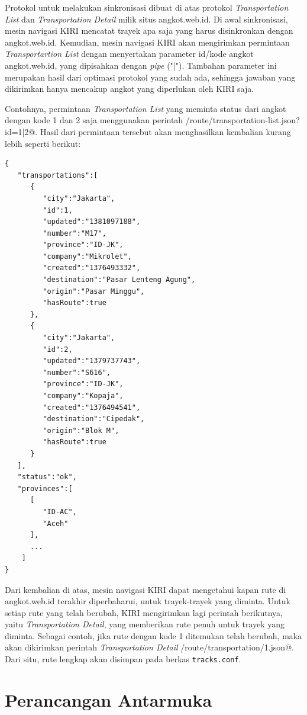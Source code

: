 Protokol untuk melakukan sinkronisasi dibuat di atas protokol \textit{Transportation List} dan \textit{Transportation Detail} milik situs angkot.web.id. Di awal sinkronisasi, mesin navigasi KIRI mencatat trayek apa saja yang harus disinkronkan dengan angkot.web.id. Kemudian, mesin navigasi KIRI akan mengirimkan permintaan \textit{Transportartion List} dengan menyertakan parameter id/kode angkot angkot.web.id, yang dipisahkan dengan \textit{pipe} ("|"). Tambahan parameter ini merupakan hasil dari optimasi protokol yang sudah ada, sehingga jawaban yang dikirimkan hanya mencakup angkot yang diperlukan oleh KIRI saja.

Contohnya, permintaan \textit{Transportation List} yang meminta status dari angkot dengan kode 1 dan 2 saja menggunakan perintah \verb@GET /route/transportation-list.json?id=1|2@. Hasil dari permintaan tersebut akan menghasilkan kembalian kurang lebih seperti berikut:

\begin{lstlisting}
{
   "transportations":[
      {
         "city":"Jakarta",
         "id":1,
         "updated":"1381097188",
         "number":"M17",
         "province":"ID-JK",
         "company":"Mikrolet",
         "created":"1376493332",
         "destination":"Pasar Lenteng Agung",
         "origin":"Pasar Minggu",
         "hasRoute":true
      },
      {
         "city":"Jakarta",
         "id":2,
         "updated":"1379737743",
         "number":"S616",
         "province":"ID-JK",
         "company":"Kopaja",
         "created":"1376494541",
         "destination":"Cipedak",
         "origin":"Blok M",
         "hasRoute":true
      }
   ],
   "status":"ok",
   "provinces":[
      [
         "ID-AC",
         "Aceh"
      ],
      ...
    ]
}
\end{lstlisting}

Dari kembalian di atas, mesin navigasi KIRI dapat mengetahui kapan rute di angkot.web.id terakhir diperbaharui, untuk trayek-trayek yang diminta. Untuk setiap rute yang telah berubah, KIRI mengirimkan lagi perintah berikutnya, yaitu \textit{Transportation Detail}, yang memberikan rute penuh untuk trayek yang diminta. Sebagai contoh, jika rute dengan kode 1 ditemukan telah berubah, maka akan dikirimkan perintah \textit{Transportation Detail} \verb@GET /route/transportation/1.json@. Dari situ, rute lengkap akan disimpan pada berkas \verb/tracks.conf/.

\section{Perancangan Antarmuka}

